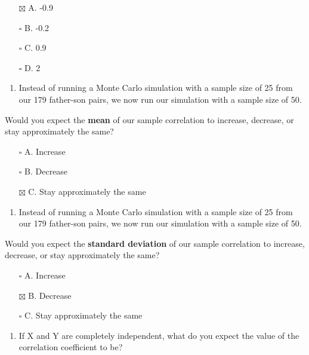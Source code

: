 \documentclass[
]{article}
\providecommand{\tightlist}{%
  \setlength{\itemsep}{0pt}\setlength{\parskip}{0pt}}
\begin{document}
\begin{itemize}
\tightlist
\item[$\boxtimes$]
  A. -0.9
\item[$\square$]
  B. -0.2
\item[$\square$]
  C. 0.9
\item[$\square$]
  D. 2
\end{itemize}

\begin{enumerate}
\def\labelenumi{\arabic{enumi}.}
\setcounter{enumi}{3}
\tightlist
\item
  Instead of running a Monte Carlo simulation with a sample size of 25
  from our 179 father-son pairs, we now run our simulation with a sample
  size of 50.
\end{enumerate}

Would you expect the \textbf{mean} of our sample correlation to
increase, decrease, or stay approximately the same?

\begin{itemize}
\tightlist
\item[$\square$]
  A. Increase
\item[$\square$]
  B. Decrease
\item[$\boxtimes$]
  C. Stay approximately the same
\end{itemize}

\begin{enumerate}
\def\labelenumi{\arabic{enumi}.}
\setcounter{enumi}{4}
\tightlist
\item
  Instead of running a Monte Carlo simulation with a sample size of 25
  from our 179 father-son pairs, we now run our simulation with a sample
  size of 50.
\end{enumerate}

Would you expect the \textbf{standard deviation} of our sample
correlation to increase, decrease, or stay approximately the same?

\begin{itemize}
\tightlist
\item[$\square$]
  A. Increase
\item[$\boxtimes$]
  B. Decrease
\item[$\square$]
  C. Stay approximately the same
\end{itemize}

\begin{enumerate}
\def\labelenumi{\arabic{enumi}.}
\setcounter{enumi}{5}
\tightlist
\item
  If X and Y are completely independent, what do you expect the value of
  the correlation coefficient to be?
\end{enumerate}
\end{document}
